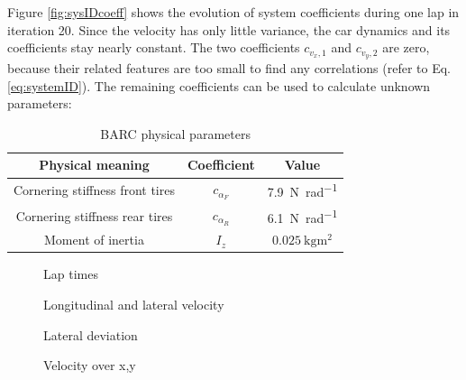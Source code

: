 Figure \ref{fig:sysIDcoeff} shows the evolution of system coefficients during one lap in iteration 20. Since the velocity has only little variance, the car dynamics and its coefficients stay nearly constant. The two coefficients $c_{v_x,1}$ and $c_{v_y,2}$ are zero, because their related features are too small to find any correlations (refer to Eq. \eqref{eq:systemID}). The remaining coefficients can be used to calculate unknown parameters:
\begin{table}[h!]
\centering
\caption{BARC physical parameters}
\begin{tabular}{c|c|c}
Physical meaning & Coefficient & Value\\
\hline
Cornering stiffness front tires & $c_{\alpha_F}$ & \SI{7.9}{\newton\per\radian}\\
Cornering stiffness rear tires & $c_{\alpha_R}$ & \SI{6.1}{\newton\per\radian}\\
Moment of inertia & $I_z$ & $\SI{0.025}{\kilo\gram\square\meter}$
\end{tabular}
\end{table}


\begin{figure}[ht]
    \centering
      
    \caption{Lap times}
    \label{fig:exp_lapTime}
\end{figure}

\begin{figure}[ht]
    \centering
      
    \caption{Longitudinal and lateral velocity}
    \label{fig:exp_v}
\end{figure}

\begin{figure}[ht]
    \centering
      
    \caption{Lateral deviation}
    \label{fig:exp_e_Y}
\end{figure}

\begin{figure}[ht]
    \centering
      
    \caption{Velocity over x,y}
    \label{fig:exp_v_over_xy}
\end{figure}

